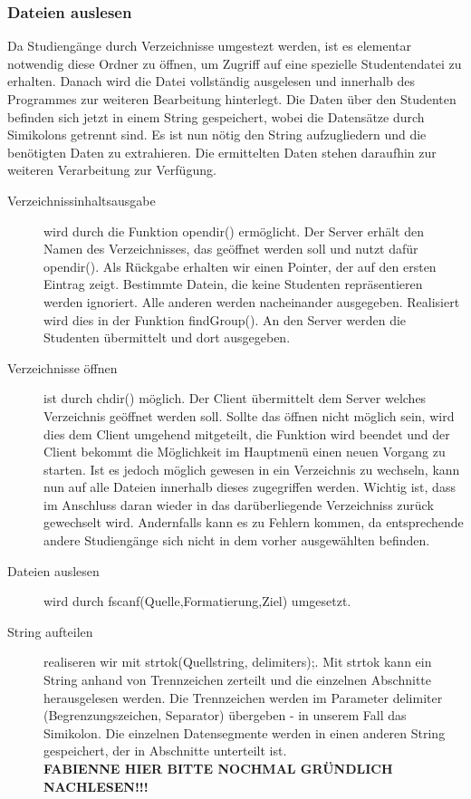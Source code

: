 \documentclass{scrartcl}
\begin{document}
		\subsubsection{Dateien auslesen}
			Da Studiengänge durch Verzeichnisse umgestezt werden, ist es elementar notwendig diese Ordner zu öffnen, um Zugriff auf eine spezielle Studentendatei zu erhalten. Danach wird die Datei vollständig ausgelesen und innerhalb des Programmes zur weiteren Bearbeitung hinterlegt. Die Daten über den Studenten befinden sich jetzt in einem String gespeichert, wobei die Datensätze durch Simikolons getrennt sind. Es ist nun nötig den String aufzugliedern und die benötigten Daten zu extrahieren. Die ermittelten Daten stehen daraufhin zur weiteren Verarbeitung zur Verfügung.
			\begin{description}
				\item[Verzeichnissinhaltsausgabe] wird durch die Funktion opendir() ermöglicht. Der Server erhält den Namen des Verzeichnisses, das geöffnet werden soll und nutzt dafür opendir(). Als Rückgabe erhalten wir einen Pointer, der auf den ersten Eintrag zeigt. Bestimmte Datein, die keine Studenten repräsentieren werden ignoriert. Alle anderen werden nacheinander ausgegeben. Realisiert wird dies in der Funktion findGroup(). An den Server werden die Studenten übermittelt und dort ausgegeben.
				\item[Verzeichnisse öffnen] ist durch chdir() möglich. Der Client übermittelt dem Server welches Verzeichnis geöffnet werden soll. Sollte das öffnen nicht möglich sein, wird dies dem Client umgehend mitgeteilt, die Funktion wird beendet und der Client bekommt die Möglichkeit im Hauptmenü einen neuen Vorgang zu starten. Ist es jedoch möglich gewesen in ein Verzeichnis zu wechseln, kann nun auf alle Dateien innerhalb dieses zugegriffen werden. Wichtig ist, dass im Anschluss daran wieder in das darüberliegende Verzeichniss zurück gewechselt wird. Andernfalls kann es zu Fehlern kommen, da entsprechende andere Studiengänge sich nicht in dem vorher ausgewählten befinden.
				\item[Dateien auslesen] wird durch fscanf(Quelle,Formatierung,Ziel) umgesetzt.
				\item[String aufteilen] realiseren wir mit  strtok(Quellstring, delimiters);. Mit strtok kann ein String anhand von Trennzeichen zerteilt und die einzelnen Abschnitte herausgelesen werden. Die Trennzeichen werden im Parameter delimiter (Begrenzungszeichen, Separator) übergeben - in unserem Fall das Simikolon. Die einzelnen Datensegmente werden in einen anderen String gespeichert, der in Abschnitte unterteilt ist. \\
				\textbf{FABIENNE HIER BITTE NOCHMAL GRÜNDLICH NACHLESEN!!!}
			\end{description}
\end{document}

